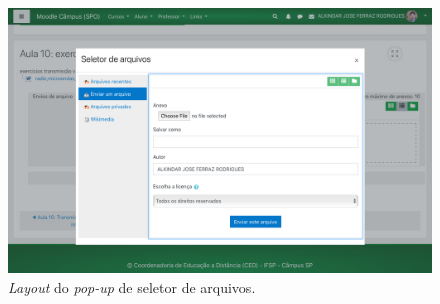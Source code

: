 \documentclass[11pt]{article}
\begin{document}
\begin{figure}[htbp]
\centering
\includegraphics[width=.9\linewidth]{./media/arquivos_2.png}
\caption[\emph{pop-up}]{\label{fig:org28d28de}\emph{Layout} do \emph{pop-up} de seletor de arquivos.}
\end{figure}
\end{document}
